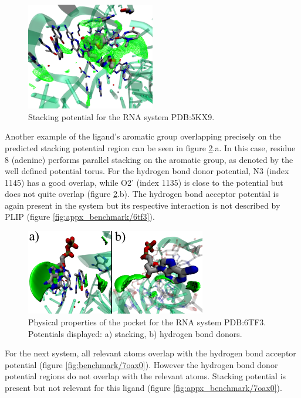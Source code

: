     \begin{figure}[H]
      \centering
      \includegraphics[width=0.5\textwidth]{figures/results/benchmark_rna/5kx9.png}
      \caption{\label{fig:benchmark/5kx9} Stacking potential for the RNA system PDB:5KX9.}
    \end{figure}

    Another example of the ligand's aromatic group overlapping precisely on the predicted stacking potential region can be seen in figure \ref{fig:benchmark/6tf3}.a. In this case, residue 8 (adenine) performs parallel stacking on the aromatic group, as denoted by the well defined potential torus. For the hydrogen bond donor potential, N3 (index 1145) has a good overlap, while O2' (index 1135) is close to the potential but does not quite overlap (figure \ref{fig:benchmark/6tf3}.b). The hydrogen bond acceptor potential is again present in the system but its respective interaction is not described by PLIP (figure \ref{fig:appx_benchmark/6tf3}).

    \begin{figure}[H]
      \centering
      \includegraphics[width=0.7\textwidth]{figures/results/benchmark_rna/6tf3.png}
      \caption{\label{fig:benchmark/6tf3} Physical properties of the pocket for the RNA system PDB:6TF3. Potentials displayed: a) stacking, b) hydrogen bond donors.}
    \end{figure}

    For the next system, all relevant atoms overlap with the hydrogen bond acceptor potential (figure \ref{fig:benchmark/7oax0}). However the hydrogen bond donor potential regions do not overlap with the relevant atoms. Stacking potential is present but not relevant for this ligand (figure \ref{fig:appx_benchmark/7oax0}).

